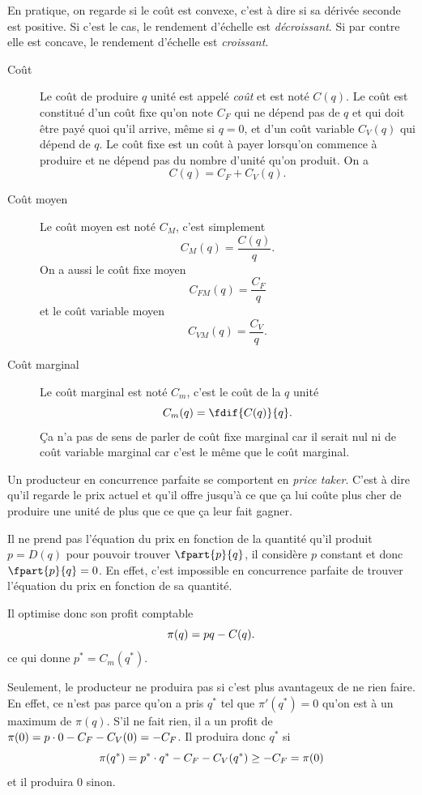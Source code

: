 En pratique, on regarde si le coût est convexe,
c'est à dire si sa dérivée seconde est positive.
Si c'est le cas, le rendement d'échelle est \emph{décroissant}.
Si par contre elle est concave, le rendement d'échelle est \emph{croissant}.

\begin{description}
  \item[Coût]
    Le coût de produire $q$ unité est appelé \emph{coût} et est noté $C(q)$.
    Le coût est constitué d'un coût fixe qu'on note $C_F$ qui ne dépend
    pas de $q$ et qui doit être payé quoi qu'il arrive,
    même si $q = 0$, et d'un coût
    variable $C_V(q)$ qui dépend de $q$.
    Le coût fixe est un coût à payer lorsqu'on commence à produire
    et ne dépend pas du nombre d'unité qu'on produit. On a
    \[ C(q) = C_F + C_V(q). \]
  \item[Coût moyen]
    Le coût moyen est noté $C_M$, c'est simplement
    \[ C_M(q) = \frac{C(q)}{q}. \]
    On a aussi le coût fixe moyen
    \[ C_{FM}(q) = \frac{C_F}{q} \]
    et le coût variable moyen
    \[ C_{VM}(q) = \frac{C_V}{q}. \]
  \item[Coût marginal]
    Le coût marginal est noté $C_m$, c'est le coût de la $q$\ieme{} unité
    \[ C_m(q) = \fdif{C(q)}{q}. \]
    Ça n'a pas de sens de parler de coût fixe marginal car il serait nul
    ni de coût variable marginal car c'est le même que le coût marginal.
\end{description}

Un producteur en concurrence parfaite se comportent en \emph{price taker}.
C'est à dire qu'il regarde le prix actuel et qu'il offre jusqu'à
ce que ça lui coûte plus cher de produire une unité de plus que ce que
ça leur fait gagner.

Il ne prend pas l'équation du prix en fonction de la quantité
qu'il produit $p = D(q)$ pour pouvoir trouver $\fpart{p}{q}$,
il considère $p$ constant et donc $\fpart{p}{q} = 0$.
En effet, c'est impossible en concurrence parfaite de trouver
l'équation du prix en fonction de sa quantité.

Il optimise donc son profit comptable
\[ \pi(q) = pq - C(q). \]
ce qui donne $p^* = C_m(q^*)$.

Seulement, le producteur ne produira pas si c'est plus avantageux de
ne rien faire.
En effet, ce n'est pas parce qu'on a pris $q^*$ tel que $\pi'(q^*) = 0$ qu'on
est à un maximum de $\pi(q)$.
S'il ne fait rien, il a un profit de
$\pi(0) = p \cdot 0 - C_F - C_V(0) = -C_F$.
Il produira donc $q^*$ si
\[ \pi(q^*) = p^* \cdot q^* - C_F - C_V(q^*) \geq -C_F = \pi(0) \]
et il produira 0 sinon.


